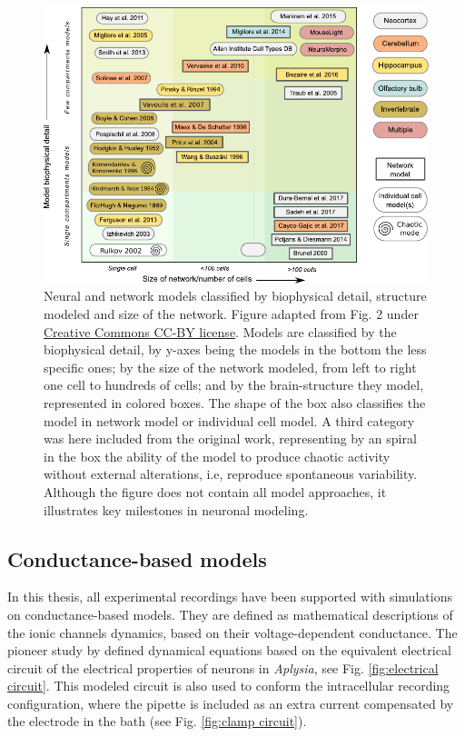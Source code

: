 \begin{figure}[bth!]
	\centering
	\includegraphics[width=\textwidth]{img/intro/models classification_v2.pdf}
	\caption{Neural and network models classified by biophysical detail, structure modeled and size of the network. Figure adapted from Fig. 2 \cite{gleeson_open_2019} under \href{http://creativecommons.org/licenses/by/4.0/}{Creative Commons CC-BY license}. Models are classified by the biophysical detail, by y-axes being the models in the bottom the less specific ones; by the size of the network modeled, from left to right one cell to hundreds of cells; and by the brain-structure they model, represented in colored boxes. The shape of the box also classifies the model in network model or individual cell model. A third category was here included from the original work, representing by an spiral in the box the ability of the model to produce chaotic activity without external alterations, i.e, reproduce spontaneous variability. Although the figure does not contain all model approaches, it illustrates key milestones in neuronal modeling. }
	\label{fig:models-classification}
\end{figure}
\subsection{Conductance-based models}

In this thesis, all experimental recordings have been supported with simulations on conductance-based models. They are defined as mathematical descriptions of the ionic channels dynamics, based on their voltage-dependent conductance. The pioneer study by \cite{hodgkin_quantitative_1952} defined dynamical equations based on the equivalent electrical circuit of the electrical properties of neurons in \textit{Aplysia}, see Fig.  \ref{fig:electrical circuit}. This modeled circuit is also used to conform the intracellular recording configuration, where the pipette is included as an extra current compensated by the electrode in the bath (see Fig. \ref{fig:clamp circuit}).

